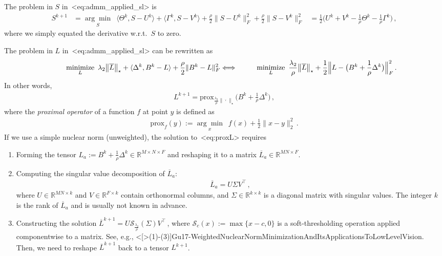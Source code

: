 \documentclass[a4paper,11pt]{article}
\def\\{}%
\def\cite#1{<#1>}%
\def\eqref#1{<#1>}%
\newcommand{\mypar}[1]{\bigskip\noindent {\bf #1.}}
\begin{document}
\mypar{Updating $\bm{S}$}
The problem in $S$ in~\eqref{eq:admm_applied_sl} is
\begin{align*}
  S^{k+1} 
  &=
  \underset{S}{\arg\min} \,\,\,
  \langle\Theta^k, S - U^k\rangle
  +
  \langle\Gamma^k, S - V^k\rangle
  +
  \frac{\rho}{2}
  \|S - U^k\|_{F}^2
  +
  \frac{\rho}{2}
  \|S - V^k\|_{F}^2
  \\ 
  &=
  \frac{1}{2}
  \Big(U^k + V^k - \frac{1}{\rho}\Theta^k - \frac{1}{\rho}\Gamma^k\Big)\,,
\end{align*}
where we simply equated the derivative w.r.t.\ $S$ to zero. 

\mypar{Updating $\bm{L}$}
The problem in $L$ in~\eqref{eq:admm_applied_sl} can be rewritten as
\begin{align}
  &\qquad
  \underset{L}{\text{minimize}} \,\,\,
  \lambda_2 \big\|\overline{L}\big\|_{\star}
  +
  \langle\Delta^k,B^k - L\rangle
  +
  \frac{\rho}{2}
  \|B^k - L\|_{F}^2
  \notag
  \\
  \Longleftrightarrow
  &\qquad
  \underset{L}{\text{minimize}} \,\,\,
  \frac{\lambda_2}{\rho} \big\|\overline{L}\big\|_{\star}
  +
  \frac{1}{2}
  \Big\|L - \big(B^k + \frac{1}{\rho} \Delta^k\big)\Big\|_F^2\,.
  \label{eq:probL1}
\end{align}
In other words, 
\begin{align}
  \label{eq:proxL}
  L^{k+1} =
  \text{prox}_{\frac{\lambda_2}{\rho}\|\overline{\cdot}\|_{\star}}\Big(B^k +
  \frac{1}{\rho}\Delta^k\Big)\,,
\end{align}
where the \textit{proximal operator} of a function $f$ at point $y$ is
defined as
\begin{align*}
  \text{prox}_f(y)
  :=
  \underset{x}{\arg\min}\,\,\, f(x) + \frac{1}{2}\|x - y\|_2^2\,.
\end{align*}
If we use a simple nuclear norm (unweighted), the solution to~\eqref{eq:proxL}
requires
\begin{enumerate}
  \item Forming the tensor $L_a := B^k + \frac{1}{\rho}\Delta^k \in
    \mathbb{R}^{M\times N\times F}$ and reshaping it to a matrix
    $\overline{L}_a \in \mathbb{R}^{MN \times F}$.

  \item Computing the singular value decomposition of $\overline{L}_a$:
    \begin{align*}
      \overline{L}_a = U \Sigma V^\top\,,
    \end{align*}
    where $U \in \mathbb{R}^{MN \times k}$ and $V \in \mathbb{R}^{F \times k}$
    contain orthonormal columns, and $\Sigma \in \mathbb{R}^{k \times k}$ is a
    diagonal matrix with singular values. The integer $k$ is the rank of
    $\overline{L}_a$ and is usually not known in advance.

  \item Constructing the solution $\overline{L}^{k+1} = U
    \mathcal{S}_{\frac{\lambda_2}{\rho}}(\Sigma)V^\top$\,, where
    $\mathcal{S}_{c}(x) := \max\{x - c, 0\}$ is a soft-thresholding operation
    applied componentwise to a matrix. See, e.g.,
    \cite[(1)-(3)]{Gu17-WeightedNuclearNormMinimizationAndItsApplicationsToLowLevelVision}.
    Then, we need to reshape $\overline{L}^{k+1}$ back to a tensor $L^{k+1}$.
\end{enumerate}
\end{document}
